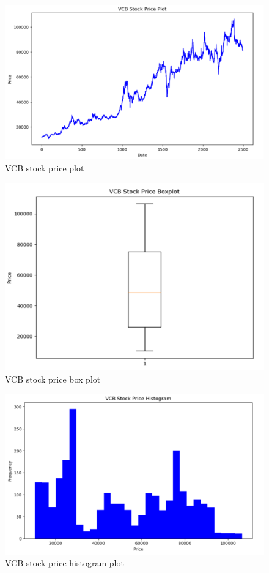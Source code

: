 \documentclass{ieeeojies}
\begin{document}
\begin{figure}[H]
    \centering
    \includegraphics[width=1\linewidth]{VCB_plot.png}
    \caption{VCB stock price plot}
    \label{fig:enter-label}
\end{figure}
\begin{figure}[H]
    \centering
    \includegraphics[width=1\linewidth]{VCB_box.png}
    \caption{VCB stock price box plot}
    \label{fig:enter-label}
\end{figure}
\begin{figure}[H]
    \centering
    \includegraphics[width=1\linewidth]{VCB_histogram.png}
    \caption{VCB stock price histogram plot}
    \label{fig:enter-label}
\end{figure}
\end{document}
